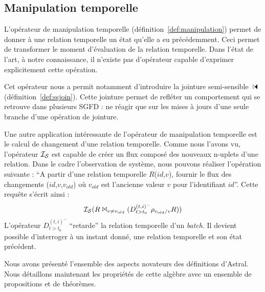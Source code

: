 \subsection{Manipulation temporelle}
L'opérateur de manipulation temporelle (définition~\ref{def:manipulation}) permet de donner à une relation temporelle un état qu'elle a eu précédemment. Ceci permet de transformer le moment d'évaluation de la relation temporelle. Dans l'état de l'art, à notre connaissance, il n'existe pas d'opérateur capable d'exprimer explicitement cette opération.

Cet opérateur nous a permit notamment d'introduire la jointure semi-sensible $\ssjoin$ (définition~\ref{def:ssjoin}). Cette jointure permet de refléter un comportement qui se retrouve dans plusieurs SGFD : ne réagir que sur les mises à jours d'une seule branche d'une opération de jointure.

Une autre application intéressante de l'opérateur de manipulation temporelle est le calcul de changement d'une relation temporelle. Comme nous l'avons vu, l'opérateur $\mathcal{I_S}$ est capable de créer un flux composé des nouveaux n-uplets d'une relation. Dans le cadre l'observation de système, nous pouvons réaliser l'opération suivante : \enquote{A partir d'une relation temporelle $R$($id$,$v$), fournir le flux des changements ($id$,$v$,$v_{old}$) où $v_{old}$ est l'ancienne valeur $v$ pour l'identifiant $id$}. Cette requête s'écrit ainsi :
$$\mathcal{I_S}(R \Join_{v\neq v_{old}} (D^{(t,i)^-}_{t>t_0}\rho_{v_{old}/v} R))$$
L'opérateur $D^{(t,i)^-}_{t>t_0}$ \enquote{retarde} la relation temporelle d'un \textit{batch}. Il devient possible d'interroger à un instant donné, une relation temporelle et son état précédent.

Nous avons présenté l'ensemble des aspects novateurs des définitions d'Astral. Nous détaillons maintenant les propriétés de cette algèbre avec un ensemble de propositions et de théorèmes.
